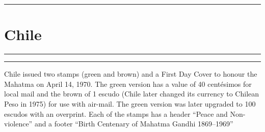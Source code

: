 \documentclass[a4paper]{article}
\begin{document}
  \hrule
\section*{Chile}
\vspace{8pt}
\hrule
\vspace{14cm}
\begin{center}
\begin{minipage}{10cm}
  \hrule \vspace{12pt} Chile issued two stamps (green and brown) and a
  First Day Cover to honour the Mahatma on April 14, 1970. The green
  version has a value of 40 cent\'{e}simos for local mail and the
  brown of 1 escudo (Chile later changed its currency to Chilean Peso
  in 1975) for use with air-mail. The green version was later upgraded
  to 100 escudos with an overprint. Each of the stamps has a header
  ``Peace and Non-violence'' and a footer ``Birth Centenary of Mahatma
  Gandhi 1869--1969''
\end{minipage}
\end{center}

\end{document}
